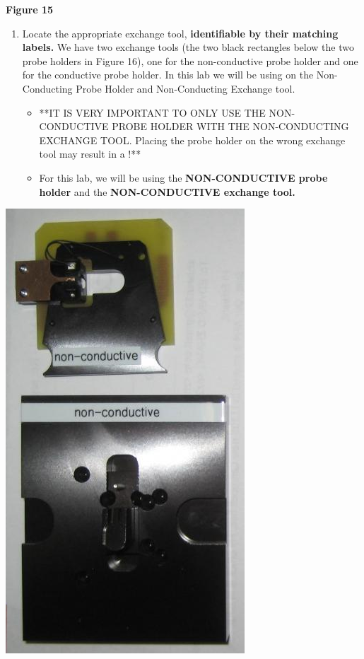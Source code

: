 \documentclass{../lab}
\begin{document}
\textbf{Figure 15}

\begin{enumerate}
    \item Locate the appropriate exchange tool, \textbf{identifiable by their matching labels.} We have two exchange tools (the two black rectangles below the two probe holders in Figure 16), one for the non-conductive probe holder and one for the conductive probe holder.  In this lab we will be using on the Non-Conducting Probe Holder and Non-Conducting Exchange tool.
    \begin{itemize}
        \item **IT IS VERY IMPORTANT TO ONLY USE THE NON-CONDUCTIVE PROBE HOLDER WITH THE NON-CONDUCTING EXCHANGE TOOL.  Placing the probe holder on the wrong exchange tool may result in a \textbf{}!**

        \item For this lab, we will be using the \textbf{NON-CONDUCTIVE probe holder} and the \textbf{NON-CONDUCTIVE exchange tool.}

    \end{itemize}

\end{enumerate}


\begin{center}
    \href{http://experimentationlab.berkeley.edu/sites/default/files/AFMImages/ProbeHolderExchange.png}{\includegraphics[width=0.5\linewidth]{images/ProbeHolderExchange.png}}
\end{center}
\end{document}
